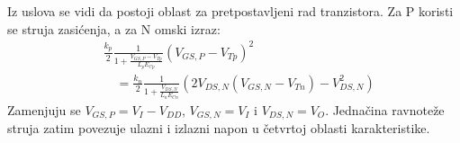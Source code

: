 Iz uslova se vidi da postoji oblast za pretpostavljeni rad tranzistora. Za P koristi se struja zasićenja, a za N omski izraz:
\[\begin{aligned}&\frac{k_p}2\frac1{1+\frac{V_{GS,P}-V_{Tp}}{L_pE_{Cp}}}(V_{GS,P}-V_{Tp})^2\\&\quad=\frac{k_n}2\frac1{1+\frac{V_{DS,N}}{L_nE_{Cn}}}\left(2V_{DS,N}(V_{GS,N}-V_{Tn})-V_{DS,N}^2\right)\end{aligned}\]
Zamenjuju se $V_{GS,P}=V_I-V_{DD}$, $V_{GS,N}=V_I$ i $V_{DS,N}=V_O$. Jednačina ravnoteže struja zatim povezuje ulazni i izlazni napon u četvrtoj oblasti karakteristike.
